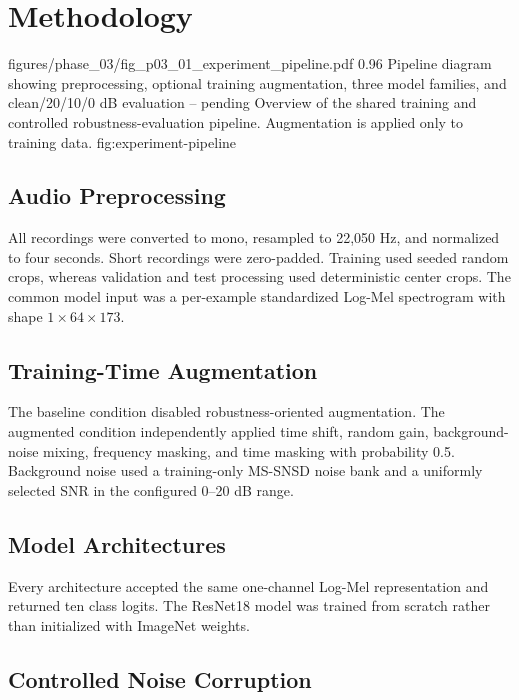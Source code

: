 \section{Methodology}

\ProjectFigure
  {figures/phase_03/fig_p03_01_experiment_pipeline.pdf}
  {0.96\columnwidth}
  {Pipeline diagram showing preprocessing, optional training augmentation,
  three model families, and clean/20/10/0 dB evaluation -- pending}
  {Overview of the shared training and controlled robustness-evaluation
  pipeline. Augmentation is applied only to training data.}
  {fig:experiment-pipeline}

\subsection{Audio Preprocessing}

All recordings were converted to mono, resampled to 22,050 Hz, and normalized
to four seconds. Short recordings were zero-padded. Training used seeded random
crops, whereas validation and test processing used deterministic center crops.
The common model input was a per-example standardized Log-Mel spectrogram with
shape $1 \times 64 \times 173$.



\subsection{Training-Time Augmentation}

The baseline condition disabled robustness-oriented augmentation. The augmented
condition independently applied time shift, random gain, background-noise
mixing, frequency masking, and time masking with probability 0.5. Background
noise used a training-only MS-SNSD noise bank and a uniformly selected SNR in
the configured 0--20 dB range.

\subsection{Model Architectures}



Every architecture accepted the same one-channel Log-Mel representation and
returned ten class logits. The ResNet18 model was trained from scratch rather
than initialized with ImageNet weights.

\subsection{Controlled Noise Corruption}

